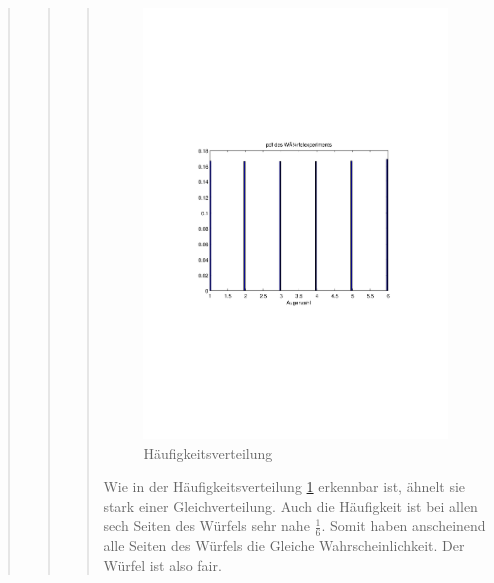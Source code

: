\begin{quote}
\begin{quote}
\begin{quote}
            
            \begin{figure}[H]
            \centering
                \includegraphics[scale=0.7, trim = 20mm 80mm 20mm 90mm, clip]{Bilder/fairer_wuerfel}
                    \caption{Häufigkeitsverteilung}
                    \label{fig:fairer_wuerfel}
            \end{figure}
            
            Wie in der Häufigkeitsverteilung \ref{fig:fairer_wuerfel} erkennbar ist, ähnelt sie stark einer Gleichverteilung.
            Auch die Häufigkeit ist bei allen sech Seiten des Würfels sehr nahe $\frac{1}{6}$. Somit haben anscheinend alle Seiten
            des Würfels die Gleiche Wahrscheinlichkeit.
            Der Würfel ist also fair.
           
        \end{quote}
        

\end{quote}
\end{quote}
